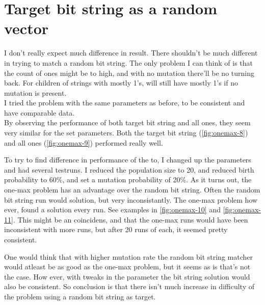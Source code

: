 \section{Target bit string as a random vector}
I don't really expect much difference in result. There shouldn't be much different in trying to
match a random bit string. The only problem I can think of is that the count of ones might be
to high, and with no mutation there'll be no turning back. For children of strings with 
mostly 1's, will still have mostly 1's if no mutation is present. \\

I tried the problem with the same parameters as before, to be consistent and have comparable
data. \\

By observing the performance of both target bit string and all ones, they seem very similar for
the set parameters. Both the target bit string (\autoref{fig:onemax-8}) and all ones (\autoref{fig:onemax-9})
performed really well.





To try to find difference in performance of the to, I changed up the parameters and had several testruns.
I reduced the population size to 20, and reduced birth probability to 60\%, and set a mutation probability
of 20\%. As it turns out, the one-max problem has an advantage over the random bit string. Often the 
random bit string run would solution, but very inconsistantly. The one-max problem how ever, found a
solution every run. See examples in \autoref{fig:onemax-10} and \autoref{fig:onemax-11}. This might be
an coincidens, and that the one-max runs would have been inconsistent with more runs, but after 20 runs
of each, it seemed pretty consistent. 





One would think that with higher mutation rate the random bit string matcher would atleast be as good
as the one-max problem, but it seems as is that's not the case. How ever, with tweaks in the parameter
the bit string solution would also be consistent. So conclusion is that there isn't much increase in 
difficulty of the problem using a random bit string as target.